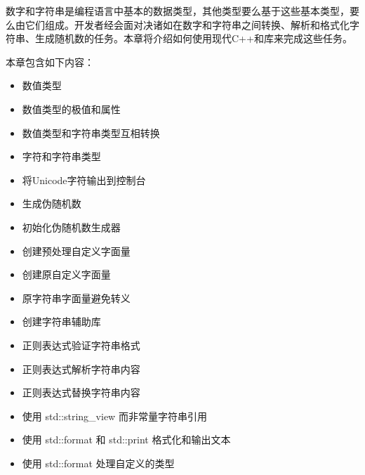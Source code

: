 数字和字符串是编程语言中基本的数据类型，其他类型要么基于这些基本类型，要么由它们组成。开发者经会面对决诸如在数字和字符串之间转换、解析和格式化字符串、生成随机数的任务。本章将介绍如何使用现代C++和库来完成这些任务。

本章包含如下内容：

\begin{itemize}
\item
数值类型

\item
数值类型的极值和属性

\item
数值类型和字符串类型互相转换

\item
字符和字符串类型

\item
将Unicode字符输出到控制台

\item
生成伪随机数

\item
初始化伪随机数生成器

\item
创建预处理自定义字面量

\item
创建原自定义字面量

\item
原字符串字面量避免转义

\item
创建字符串辅助库

\item
正则表达式验证字符串格式

\item
正则表达式解析字符串内容

\item
正则表达式替换字符串内容

\item
使用 std::string\_view 而非常量字符串引用

\item
使用 std::format 和 std::print 格式化和输出文本

\item
使用 std::format 处理自定义的类型
\end{itemize}


